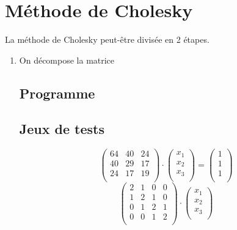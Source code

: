 \documentclass{report}
\begin{document}
                
    \newpage
    \section{Méthode de Cholesky}
      La méthode de Cholesky peut-être divisée en 2 étapes.
      \begin{enumerate}
        \item{On décompose la matrice}
      \subsection{Programme}
        
      \newpage
      \subsection{Jeux de tests}
      	\begin{equation}
        \begin{pmatrix}
		  64 & 40 & 24 \\
		  40 & 29 & 17 \\
		  24 & 17 & 19 \\
        \end{pmatrix}
        \cdot
        \begin{pmatrix}
          x_1 \\
          x_2 \\
          x_3 \\
        \end{pmatrix}
        =
        \begin{pmatrix}
          1 \\
          1 \\
          1 \\
        \end{pmatrix}
        \end{equation}
        \begin{equation}
        \begin{pmatrix}
		  2 & 1 & 0 & 0 \\
		  1 & 2 & 1 & 0 \\
		  0 & 1 & 2 & 1 \\
		  0 & 0 & 1 & 2 \\
        \end{pmatrix}
        \cdot
        \begin{pmatrix}
          x_1 \\
          x_2 \\
          x_3 \\

\end{pmatrix}
\end{equation}
\end{enumerate}
\end{document}
